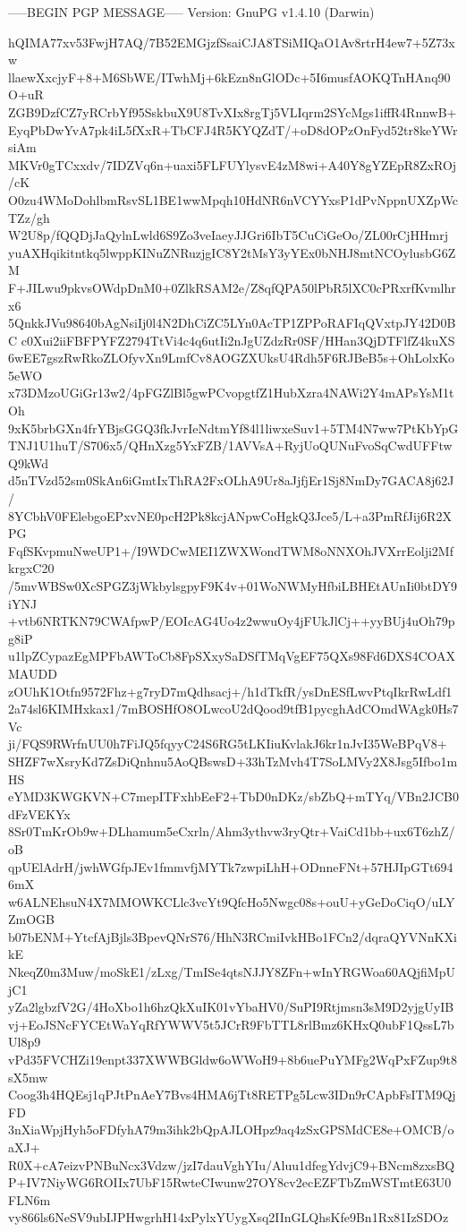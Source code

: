 -----BEGIN PGP MESSAGE-----
Version: GnuPG v1.4.10 (Darwin)

hQIMA77xv53FwjH7AQ/7B52EMGjzfSsaiCJA8TSiMIQaO1Av8rtrH4ew7+5Z73xw
llaewXxcjyF+8+M6SbWE/ITwhMj+6kEzn8nGlODc+5I6musfAOKQTnHAnq90O+uR
ZGB9DzfCZ7yRCrbYf95SskbuX9U8TvXIx8rgTj5VLIqrm2SYcMgs1iffR4RnnwB+
EyqPbDwYvA7pk4iL5fXxR+TbCFJ4R5KYQZdT/+oD8dOPzOnFyd52tr8keYWrsiAm
MKVr0gTCxxdv/7IDZVq6n+uaxi5FLFUYlysvE4zM8wi+A40Y8gYZEpR8ZxROj/cK
O0zu4WMoDohlbmRsvSL1BE1wwMpqh10HdNR6nVCYYxsP1dPvNppnUXZpWcTZz/gh
W2U8p/fQQDjJaQylnLwld6S9Zo3veIaeyJJGri6IbT5CuCiGeOo/ZL00rCjHHmrj
yuAXHqikitntkq5lwppKINuZNRuzjgIC8Y2tMsY3yYEx0bNHJ8mtNCOylusbG6ZM
F+JILwu9pkvsOWdpDnM0+0ZlkRSAM2e/Z8qfQPA50lPbR5lXC0cPRxrfKvmlhrx6
5QnkkJVu98640bAgNsiIj0l4N2DhCiZC5LYn0AcTP1ZPPoRAFIqQVxtpJY42D0BC
c0Xui2iiFBFPYFZ2794TtVi4c4q6utIi2nJgUZdzRr0SF/HHan3QjDTFlfZ4kuXS
6wEE7gszRwRkoZLOfyvXn9LmfCv8AOGZXUksU4Rdh5F6RJBeB5s+OhLolxKo5eWO
x73DMzoUGiGr13w2/4pFGZlBl5gwPCvopgtfZ1HubXzra4NAWi2Y4mAPsYsM1tOh
9xK5brbGXn4frYBjsGGQ3fkJvrIeNdtmYf84l1liwxeSuv1+5TM4N7ww7PtKbYpG
TNJ1U1huT/S706x5/QHnXzg5YxFZB/1AVVsA+RyjUoQUNuFvoSqCwdUFFtwQ9kWd
d5nTVzd52sm0SkAn6iGmtIxThRA2FxOLhA9Ur8aJjfjEr1Sj8NmDy7GACA8j62J/
8YCbhV0FElebgoEPxvNE0pcH2Pk8kcjANpwCoHgkQ3Jce5/L+a3PmRfJij6R2XPG
FqfSKvpmuNweUP1+/I9WDCwMEI1ZWXWondTWM8oNNXOhJVXrrEolji2MfkrgxC20
/5mvWBSw0XcSPGZ3jWkbylsgpyF9K4v+01WoNWMyHfbiLBHEtAUnIi0btDY9iYNJ
+vtb6NRTKN79CWAfpwP/EOIcAG4Uo4z2wwuOy4jFUkJlCj++yyBUj4uOh79pg8iP
u1lpZCypazEgMPFbAWToCb8FpSXxySaDSfTMqVgEF75QXs98Fd6DXS4COAXMAUDD
zOUhK1Otfn9572Fhz+g7ryD7mQdhsacj+/h1dTkfR/ysDnESfLwvPtqIkrRwLdf1
2a74sl6KIMHxkax1/7mBOSHfO8OLwcoU2dQood9tfB1pycghAdCOmdWAgk0Hs7Vc
ji/FQS9RWrfnUU0h7FiJQ5fqyyC24S6RG5tLKIiuKvlakJ6kr1nJvI35WeBPqV8+
SHZF7wXsryKd7ZsDiQnhnu5AoQBswsD+33hTzMvh4T7SoLMVy2X8Jsg5Ifbo1mHS
eYMD3KWGKVN+C7mepITFxhbEeF2+TbD0nDKz/sbZbQ+mTYq/VBn2JCB0dFzVEKYx
8Sr0TmKrOb9w+DLhamum5eCxrln/Ahm3ythvw3ryQtr+VaiCd1bb+ux6T6zhZ/oB
qpUElAdrH/jwhWGfpJEv1fmmvfjMYTk7zwpiLhH+ODnneFNt+57HJIpGTt6946mX
w6ALNEhsuN4X7MMOWKCLlc3vcYt9QfcHo5Nwgc08s+ouU+yGeDoCiqO/uLYZmOGB
b07bENM+YtcfAjBjls3BpevQNrS76/HhN3RCmiIvkHBo1FCn2/dqraQYVNnKXikE
NkeqZ0m3Muw/moSkE1/zLxg/TmISe4qtsNJJY8ZFn+wInYRGWoa60AQjfiMpUjC1
yZa2lgbzfV2G/4HoXbo1h6hzQkXuIK01vYbaHV0/SuPI9Rtjmsn3sM9D2yjgUyIB
vj+EoJSNcFYCEtWaYqRfYWWV5t5JCrR9FbTTL8rlBmz6KHxQ0ubF1QssL7bUl8p9
vPd35FVCHZi19enpt337XWWBGldw6oWWoH9+8b6uePuYMFg2WqPxFZup9t8sX5mw
Coog3h4HQEsj1qPJtPnAeY7Bvs4HMA6jTt8RETPg5Lcw3IDn9rCApbFsITM9QjFD
3nXiaWpjHyh5oFDfyhA79m3ihk2bQpAJLOHpz9aq4zSxGPSMdCE8e+OMCB/oaXJ+
R0X+cA7eizvPNBuNcx3Vdzw/jzI7dauVghYIu/Aluu1dfegYdvjC9+BNcm8zxsBQ
P+IV7NiyWG6ROIIx7UbF15RwteCIwunw27OY8cv2ecEZFTbZmWSTmtE63U0FLN6m
vy866ls6NeSV9ubIJPHwgrhH14xPylxYUygXsq2IInGLQhsKfe9Bn1Rx81IzSDOz
